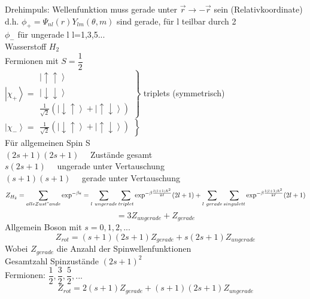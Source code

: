 \documentclass[12pt,a4paper]{report}
\numberwithin{equation}{section}
\begin{document}
Drehimpuls: Wellenfunktion muss gerade unter $ \vec{r} \rightarrow - \vec{r} $ sein (Relativkoordinate)\\
d.h. $\phi_+ = \Psi_{nl}(r) Y_{lm}(\theta, m)$ sind gerade, für l teilbar durch 2 \\[1.5ex]
$\phi_- $ für ungerade l l=1,3,5... \\[2ex]
Wasserstoff $H_2$ \\[1.5ex]
Fermionen mit $S=\dfrac{1}{2}$ \\[1.5ex]
$\left| \chi_+ \right\rangle = \left. \begin{array}{c} 
\left| \uparrow \uparrow \right\rangle \\
\left| \downarrow \downarrow \right\rangle \\
\frac{1}{\sqrt{2}} (\left| \downarrow \uparrow \right\rangle + \left| \uparrow \downarrow \right\rangle )

\end{array} \right\rbrace $ triplets (symmetrisch) \\
$\left| \chi_- \right\rangle = \left. \begin{array}{c} \frac{1}{\sqrt{2}} (\left| \downarrow \uparrow \right\rangle + \left| \uparrow \downarrow \right\rangle ) \end{array} \right\rbrace $ \\[1.5ex]
Für allgemeinen Spin S \\
$(2s+1)(2s+1) \quad $ Zustände gesamt \\[1.5ex]
$s(2s+1) \quad$ ungerade unter Vertauschung\\[1.5ex]
$(s+1)(s+1) \quad $ gerade unter Vertauschung \\[2ex]
$$Z_{H_2} = \sum \limits _{alle Zust"ande} \exp ^{-\beta \epsilon } = \sum \limits _{l\ ungerade} \sum \limits _ {triplet} \exp^{-\beta \frac{l(l+1)\hbar^2}{2I}}(2l+1) + \sum \limits _{l\ gerade} \sum \limits _ {singulett} \exp^{-\beta \frac{l(l+1)\hbar^2}{2I}}(2l+1)$$ $$ = 3 Z_{ungerade} + Z_{gerade}$$
Allgemein Boson mit $ s= 0,1,2,...$ 
$$ Z_{rot} = (s+1)(2s+1) Z_{gerade} + s(2s+1) Z_{ungerade} $$ Wobei $Z_{gerade}$ die Anzahl der Spinwellenfunktionen \\[1.5ex]
Gesamtzahl Spinzustände $(2s+1)^2$ \\[1.5ex]
Fermionen: $\dfrac{1}{2},\dfrac{3}{2},\dfrac{5}{2}, ...$
$$Z_{rot} = 2(s+1)Z_{gerade} + (s+1)(2s+1) Z_{ungerade} $$ 
\end{document}
